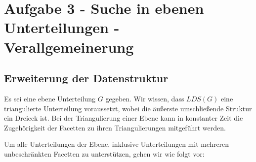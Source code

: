 \documentclass[a4paper]{article}
\begin{document}
\begin{figure} [htbp]
\label{test} 
\end{figure} 

\section*{Aufgabe 3 - Suche in ebenen Unterteilungen - Verallgemeinerung}
\subsection*{Erweiterung der Datenstruktur}
Es sei eine ebene Unterteilung $G$ gegeben. Wir wissen, dass $LDS(G)$ eine triangulierte Unterteilung voraussetzt, wobei die äußerste
umschließende Struktur ein Dreieck ist. Bei der Triangulierung einer Ebene kann in konstanter Zeit die Zugehörigkeit der Facetten
zu ihren Triangulierungen mitgeführt werden. 

Um alle Unterteilungen der Ebene, inklusive Unterteilungen mit mehreren unbeschränkten Facetten zu unterstützen, 
gehen wir wie folgt vor:
\end{document}
